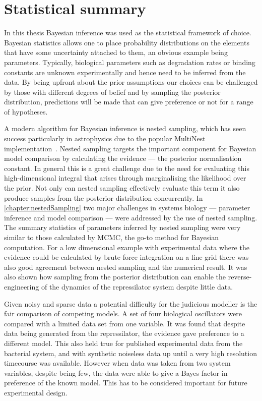 \section{Statistical summary}
In this thesis Bayesian inference was used as the statistical framework of choice.
Bayesian statistics allows one to place probability distributions on the elements that have some uncertainty attached to them, an obvious example being parameters.
Typically, biological parameters such as degradation rates or binding constants are unknown experimentally and hence need to be inferred from the data.
By being upfront about the prior assumptions our choices can be challenged by those with different degrees of belief and by sampling the posterior distribution, predictions will be made that can give preference or not for a range of hypotheses.

A modern algorithm for Bayesian inference is nested sampling, which has seen success particularly in astrophysics due to the popular MultiNest implementation~\cite{feroz2009multinest}.
Nested sampling targets the important component for Bayesian model comparison by calculating the evidence --- the posterior normalisation constant.
In general this is a great challenge due to the need for evaluating this high-dimensional integral that arises through marginalising the likelihood over the prior.
Not only can nested sampling effectively evaluate this term it also produce samples from the posterior distribution concurrently.
In \autoref{chapter:nestedSampling} two major challenges in systems biology --- parameter inference and model comparison --- were addressed by the use of nested sampling.
The summary statistics of parameters inferred by nested sampling were very similar to those calculated by MCMC, the go-to method for Bayesian computation.
For a low dimensional example with experimental data where the evidence could be calculated by brute-force integration on a fine grid there was also good agreement between nested sampling and the numerical result.
It was also shown how sampling from the posterior distribution can enable the reverse-engineering of the dynamics of the repressilator system despite little data.

Given noisy and sparse data a potential difficulty for the judicious modeller is the fair comparison of competing models.
A set of four biological oscillators were compared with a limited data set from one variable.
It was found that despite data being generated from the repressilator, the evidence gave preference to a different model.
This also held true for published experimental data from the bacterial system, and with synthetic noiseless data up until a very high resolution timecourse was available.
However when data was taken from two system variables, despite being few, the data were able to give a Bayes factor in preference of the known model.
This has to be considered important for future experimental design.

